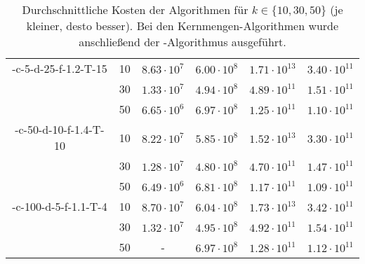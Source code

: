 \begin{table}[h]
\begin{tabular}{@{}cccccc@{}}
	\midrule
	\CsTwo-c-5-d-25-f-1.2-T-15	& 10 & $8.63 \cdot 10^7$ & $6.00 \cdot 10^8$ & $1.71 \cdot 10^{13}$ & $3.40 \cdot 10^{11}$ \\
			 					& 30 & $1.33 \cdot 10^7$ & $4.94 \cdot 10^8$ & $4.89 \cdot 10^{11}$ & $1.51 \cdot 10^{11}$ \\
		 						& 50 & $6.65 \cdot 10^6$ & $6.97 \cdot 10^8$ & $1.25 \cdot 10^{11}$ & $1.10 \cdot 10^{11}$ \\
	\midrule
	\CsTwo-c-50-d-10-f-1.4-T-10	& 10 & $8.22 \cdot 10^7$ & $5.85 \cdot 10^8$ & $1.52 \cdot 10^{13}$ & $3.30 \cdot 10^{11}$ \\
			 					& 30 & $1.28 \cdot 10^7$ & $4.80 \cdot 10^8$ & $4.70 \cdot 10^{11}$ & $1.47 \cdot 10^{11}$ \\
		 						& 50 & $6.49 \cdot 10^6$ & $6.81 \cdot 10^8$ & $1.17 \cdot 10^{11}$ & $1.09 \cdot 10^{11}$ \\
	\midrule
	\CsTwo-c-100-d-5-f-1.1-T-4	& 10 & $8.70 \cdot 10^7$ & $6.04 \cdot 10^8$ & $1.73 \cdot 10^{13}$ & $3.42 \cdot 10^{11}$ \\
			 					& 30 & $1.32 \cdot 10^7$ & $4.95 \cdot 10^8$ & $4.92 \cdot 10^{11}$ & $1.54 \cdot 10^{11}$ \\
		 						& 50 & - 				& $6.97 \cdot 10^8$ & $1.28 \cdot 10^{11}$ & $1.12 \cdot 10^{11}$ \\
	\bottomrule
\end{tabular}
\caption{Durchschnittliche Kosten der Algorithmen für $k \in \{ 10, 30, 50 \}$ (je kleiner, desto besser). Bei den
Kernmengen-Algorithmen wurde anschließend der \kmpp-Algorithmus ausgeführt.}
\label{tbl:experiment-coresets-costs-kmpp}
\end{table}
\newpage
